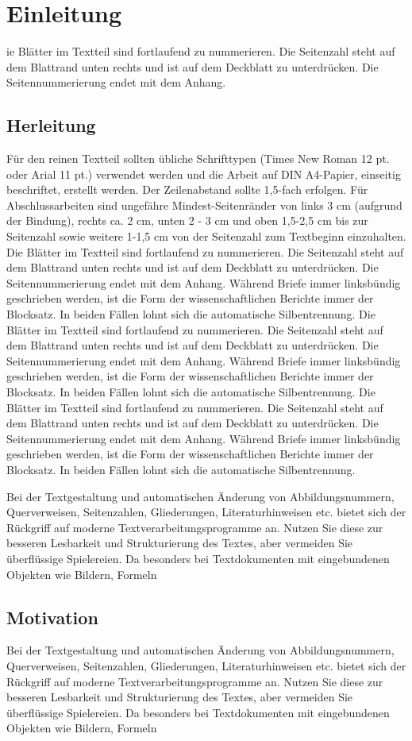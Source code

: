 \chapter{Einleitung}
\thispagestyle{fancy}
ie Blätter im Textteil sind fortlaufend zu nummerieren. Die Seitenzahl steht auf dem
Blattrand unten rechts und ist auf dem Deckblatt zu unterdrücken. Die Seitennummerierung
endet mit dem Anhang.

\section{Herleitung}
Für den reinen Textteil sollten übliche Schrifttypen (Times New Roman 12 pt. oder Arial
11 pt.) verwendet werden und die Arbeit auf DIN A4-Papier, einseitig beschriftet, erstellt
werden. Der Zeilenabstand sollte 1,5-fach erfolgen. Für Abschlussarbeiten sind ungefähre
Mindest-Seitenränder von links 3 cm (aufgrund der Bindung), rechts ca. 2 cm,
unten 2 - 3 cm und oben 1,5-2,5 cm bis zur Seitenzahl sowie weitere 1-1,5 cm von der
Seitenzahl zum Textbeginn einzuhalten.
Die Blätter im Textteil sind fortlaufend zu nummerieren. Die Seitenzahl steht auf dem
Blattrand unten rechts und ist auf dem Deckblatt zu unterdrücken. Die Seitennummerierung
endet mit dem Anhang.
Während Briefe immer linksbündig geschrieben werden, ist die Form der wissenschaftlichen
Berichte immer der Blocksatz. In beiden Fällen lohnt sich die automatische Silbentrennung.
Die Blätter im Textteil sind fortlaufend zu nummerieren. Die Seitenzahl steht auf dem
Blattrand unten rechts und ist auf dem Deckblatt zu unterdrücken. Die Seitennummerierung
endet mit dem Anhang.
Während Briefe immer linksbündig geschrieben werden, ist die Form der wissenschaftlichen
Berichte immer der Blocksatz. In beiden Fällen lohnt sich die automatische Silbentrennung.
Die Blätter im Textteil sind fortlaufend zu nummerieren. Die Seitenzahl steht auf dem
Blattrand unten rechts und ist auf dem Deckblatt zu unterdrücken. Die Seitennummerierung
endet mit dem Anhang.
Während Briefe immer linksbündig geschrieben werden, ist die Form der wissenschaftlichen
Berichte immer der Blocksatz. In beiden Fällen lohnt sich die automatische Silbentrennung.

Bei der Textgestaltung und automatischen Änderung von Abbildungsnummern, Querverweisen,
Seitenzahlen, Gliederungen, Literaturhinweisen etc. bietet sich der Rückgriff
auf moderne Textverarbeitungsprogramme an. Nutzen Sie diese zur besseren Lesbarkeit
und Strukturierung des Textes, aber vermeiden Sie überflüssige Spielereien. Da
besonders bei Textdokumenten mit eingebundenen Objekten wie Bildern, Formeln

\section{Motivation}
Bei der Textgestaltung und automatischen Änderung von Abbildungsnummern, Querverweisen,
Seitenzahlen, Gliederungen, Literaturhinweisen etc. bietet sich der Rückgriff
auf moderne Textverarbeitungsprogramme an. Nutzen Sie diese zur besseren Lesbarkeit
und Strukturierung des Textes, aber vermeiden Sie überflüssige Spielereien. Da
besonders bei Textdokumenten mit eingebundenen Objekten wie Bildern, Formeln
